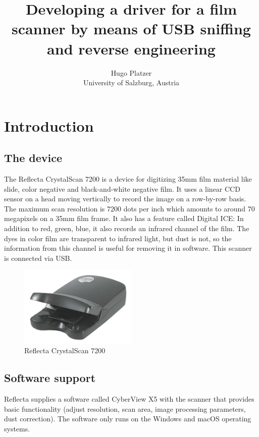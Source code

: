 \documentclass{article}
\begin{document}
\title{Developing a driver for a film scanner by means of USB sniffing and reverse engineering}
\author{Hugo Platzer \\ University of Salzburg, Austria}
\maketitle

\section{Introduction}

\subsection{The device}

The Reflecta CrystalScan 7200 is a device for digitizing 35mm film material like
slide, color negative and black-and-white negative film.
It uses a linear CCD sensor on a head moving vertically to record the image on a row-by-row basis.
The maximum scan resolution is 7200 dots per inch which amounts to around 70 megapixels
on a 35mm film frame. It also has a feature called Digital ICE: In addition to red, green, blue, it also
records an infrared channel of the film. The dyes in color film are transparent to infrared light,
but dust is not, so the information from this channel is useful for removing it in software.
This scanner is connected via USB. \cite{rcs} \cite{rcs_review}

\begin{figure}[!htbp]
  \caption{Reflecta CrystalScan 7200}
  \centering
  \includegraphics[width=0.5\textwidth]{images/presentation/the_scanner.jpg}
\end{figure}

\subsection{Software support}

Reflecta supplies a software called CyberView X5 with the scanner that
provides basic functionality (adjust resolution, scan area, image processing parameters, dust correction).
The software only runs on the Windows and macOS operating systems.
\end{document}
